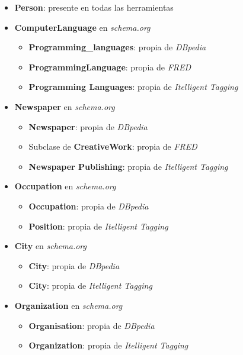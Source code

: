 \documentclass[11pt]{article}
\begin{document}
\begin{itemize}
    \item \textbf{Person}: presente en todas las herramientas
    \item \textbf{ComputerLanguage} en \textit{schema.org}
        \begin{itemize}
            \item \textbf{Programming\_languages}: propia de \textit{DBpedia}
            \item \textbf{ProgrammingLanguage}: propia de \textit{FRED}
            \item \textbf{Programming Languages}: propia de \textit{Itelligent Tagging}
        \end{itemize}
    \item \textbf{Newspaper} en \textit{schema.org} 
        \begin{itemize}
            \item \textbf{Newspaper}: propia de \textit{DBpedia}
            \item Subclase de \textbf{CreativeWork}: propia de \textit{FRED}
            \item \textbf{Newspaper Publishing}: propia de \textit{Itelligent Tagging}
        \end{itemize}
    \item \textbf{Occupation} en \textit{schema.org}
        \begin{itemize}
            \item \textbf{Occupation}: propia de \textit{DBpedia}
            \item \textbf{Position}: propia de \textit{Itelligent Tagging}
        \end{itemize}
    \item \textbf{City} en \textit{schema.org}
        \begin{itemize}
            \item \textbf{City}: propia de \textit{DBpedia}
            \item \textbf{City}: propia de \textit{Itelligent Tagging}
        \end{itemize}
    \item \textbf{Organization} en \textit{schema.org}
        \begin{itemize}
            \item \textbf{Organisation}: propia de \textit{DBpedia}
            \item \textbf{Organization}: propia de \textit{Itelligent Tagging}
        \end{itemize}
\end{itemize}
\end{document}
